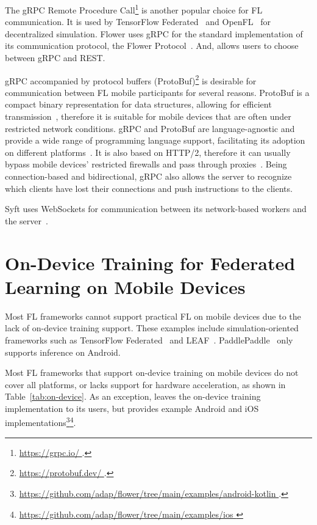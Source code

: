 \documentclass[conference]{IEEEtran}
\begin{document}
The gRPC Remote Procedure Call\footnote{\url{
    https://grpc.io/
}.} is another popular choice for FL communication.
It is used by TensorFlow Federated~\cite{tff} and
OpenFL~\cite{patrick2022openfl} for decentralized simulation.
Flower uses gRPC for the standard implementation of
its communication protocol, the Flower Protocol~\cite{beutel2020flower}.
And, \Florida{} allows users to choose between gRPC and REST.

gRPC accompanied by protocol buffers (ProtoBuf)\footnote{\url{
    https://protobuf.dev/
}.} is desirable for communication between FL mobile participants for
several reasons.
ProtoBuf is a compact binary representation for data structures,
allowing for efficient transmission~\cite{popic2016performance},
therefore it is suitable for mobile devices that
are often under restricted network conditions.
gRPC and ProtoBuf are language-agnostic and
provide a wide range of programming language support,
facilitating its adoption on different platforms~\cite{araujo2020performance}.
It is also based on HTTP/2,
therefore it can usually bypass mobile devices' restricted firewalls and
pass through proxies~\cite{araujo2020performance}.
Being connection-based and bidirectional,
gRPC also allows the server to recognize
which clients have lost their connections and
push instructions to the clients.

Syft uses WebSockets for communication between its network-based workers and
the server~\cite{Ziller2021}.

\section{On-Device Training for Federated Learning on Mobile Devices}

\label{sec:on-device}

Most FL frameworks cannot support practical FL on mobile devices due to
the lack of on-device training support.
These examples include simulation-oriented frameworks such as
TensorFlow Federated~\cite{tff,kholod2020open} and
LEAF~\cite{caldas2018leaf}.
PaddlePaddle~\cite{ma2019paddlepaddle}
only supports inference on Android.

Most FL frameworks that support on-device training on mobile devices do not
cover all platforms,
or lacks support for hardware acceleration,
as shown in Table~\ref{tab:on-device}.
As an exception,
\Flower{} leaves the on-device training implementation to
its users,
but provides example Android and iOS implementations\footnote{\url{
    https://github.com/adap/flower/tree/main/examples/android-kotlin
}.}\footnote{\url{
    https://github.com/adap/flower/tree/main/examples/ios
}}.
\end{document}
